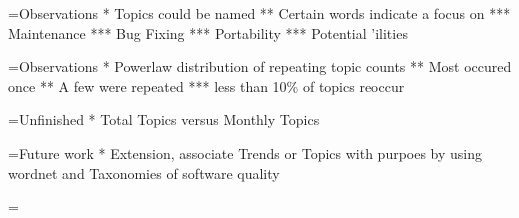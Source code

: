 \documentclass[titlepage,usenames,a4,landscape,semhelv,16pt]{seminar}
\begin{document}
\begin{slide}
\newslide









=Observations
* Topics could be named
** Certain words indicate a focus on
*** Maintenance
*** Bug Fixing
*** Portability
*** Potential 'ilities

=Observations
* Powerlaw distribution of repeating topic counts
** Most occured once
** A few were repeated 
*** less than 10\% of topics reoccur



=Unfinished
* Total Topics versus Monthly Topics

=Future work
* Extension, associate Trends or Topics with purpoes by using wordnet and Taxonomies of software quality 

=
\end{slide}
\end{document}
